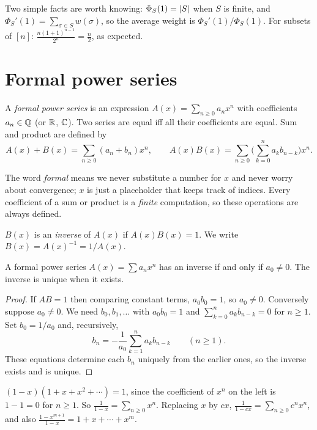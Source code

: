 Two simple facts are worth knowing: $\Phi_S(1) = \left\lvert S \right\rvert$ when $S$ is finite, and
$\Phi_S'(1) = \sum_{\sigma \in S} w(\sigma)$, so the average weight is $\Phi_S'(1)/\Phi_S(1)$.
For subsets of $[n]$: $\frac{n(1+1)^{n-1}}{2^n} = \frac{n}{2}$, as expected.

\section{Formal power series}

\begin{definition}
A \emph{formal power series} is an expression $A(x) = \sum_{n \ge 0} a_n x^n$ with
coefficients $a_n \in \mathbb{Q}$ (or $\mathbb{R}$, $\mathbb{C}$). Two series are equal iff all their coefficients
are equal. Sum and product are defined by
\[
A(x) + B(x) = \sum_{n \ge 0}(a_n + b_n) x^n, \qquad
A(x)B(x) = \sum_{n \ge 0}\Big(\sum_{k=0}^n a_k b_{n-k}\Big) x^n.
\]
\end{definition}

The word \emph{formal} means we never substitute a number for $x$ and never worry about
convergence; $x$ is just a placeholder that keeps track of indices. Every coefficient of a sum
or product is a \emph{finite} computation, so these operations are always defined.

\begin{definition}[Inverse]
$B(x)$ is an \emph{inverse} of $A(x)$ if $A(x)B(x) = 1$. We write $B(x) = A(x)^{-1} = 1/A(x)$.
\end{definition}

\begin{theorem}
A formal power series $A(x) = \sum a_n x^n$ has an inverse if and only if $a_0 \ne 0$. The
inverse is unique when it exists.
\end{theorem}
\begin{proof}
If $AB = 1$ then comparing constant terms, $a_0 b_0 = 1$, so $a_0 \ne 0$. Conversely suppose
$a_0 \neq 0$. We need $b_0, b_1, \dots$ with $a_0 b_0 = 1$ and
$\sum_{k=0}^n a_k b_{n-k} = 0$ for $n \ge 1$. Set $b_0 = 1/a_0$ and, recursively,
\[
b_n = -\frac{1}{a_0}\sum_{k=1}^{n} a_k b_{n-k} \qquad (n\ge 1).
\]
These equations determine each $b_n$ uniquely from the earlier ones, so the inverse exists and
is unique.
\end{proof}

\begin{example}
$(1-x)(1 + x + x^2 + \cdots) = 1$, since the coefficient of $x^n$ on the left is $1 - 1 = 0$ for
$n \ge 1$. So $\frac{1}{1-x} = \sum_{n \ge 0} x^n$. Replacing $x$ by $cx$,
$\frac{1}{1-cx} = \sum_{n\ge0} c^n x^n$, and also $\frac{1 - x^{m+1}}{1-x} = 1 + x + \cdots + x^m$.
\end{example}

